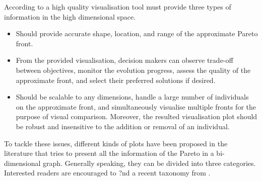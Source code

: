 According to \cite{Gao2019} a high quality visualisation tool must provide three types of information in the high dimensional space. 
\begin{itemize}
\item  Should provide accurate shape, location, and range of the approximate Pareto front. 
\item  From the provided visualisation, decision makers can observe trade-off between objectives, monitor the evolution progress, assess the quality of the approximate front, and select their preferred solutions if desired. 
\item  Should be scalable to any dimensions, handle a large number of individuals on the approximate front, and simultaneously visualise multiple fronts for the purpose of visual comparison. Moreover, the resulted visualisation plot should be robust and insensitive to the addition or removal of an individual.
\end{itemize}

To tackle these issues, different kinds of plots have been proposed in the literature that tries to present all the information of the Pareto in a bi-dimensional graph. Generally speaking, they can be divided into three categories. Interested readers are encouraged to ?nd a recent taxonomy from \cite{B.2018}.

